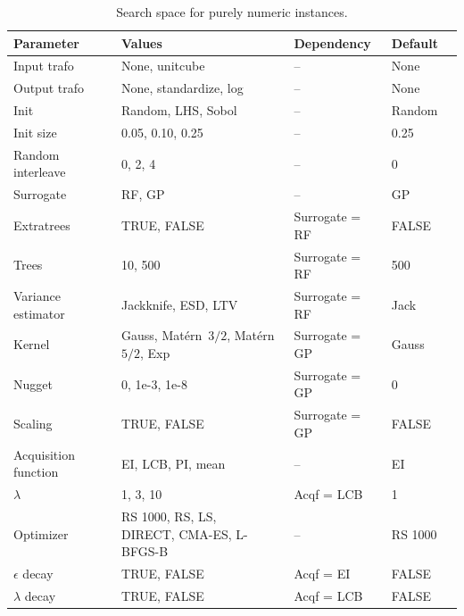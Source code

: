 \begin{table}[H]
  \centering
  \caption{Search space for purely numeric instances.}
  \label{tab:mlr3mbo-search-space-numeric}
  \begin{tabular}{lllll}
    \toprule
    Parameter            & Values                          & Dependency     & Default \\
    \midrule
    Input trafo          & None, unitcube                  & --             & None    \\
    Output trafo         & None, standardize, log          & --             & None    \\
    Init                 & Random, LHS, Sobol              & --             & Random  \\
    Init size            & 0.05, 0.10, 0.25                & --             & 0.25    \\
    Random interleave    & 0, 2, 4                         & --             & 0       \\
    Surrogate            & RF, GP                          & --             & GP      \\
    Extratrees           & TRUE, FALSE                     & Surrogate = RF &  FALSE  \\
    Trees                & 10, 500                         & Surrogate = RF & 500     \\
    Variance estimator   & Jackknife, ESD, LTV             & Surrogate = RF &  Jack    \\
    Kernel               & \makecell[l]{Gauss, Matérn~$3/2$,                            \\ Matérn~$5/2$, Exp}   & Surrogate = GP & Gauss \\
    Nugget               & 0, 1e-3, 1e-8                   & Surrogate = GP & 0       \\
    Scaling              & TRUE, FALSE                     & Surrogate = GP & FALSE   \\
    Acquisition function & EI, LCB, PI, mean               & --             & EI    \\
    $\lambda$            & 1, 3, 10                        & Acqf = LCB     & 1     \\
    Optimizer            & \makecell[l]{RS 1000, RS, LS,                              \\DIRECT, CMA-ES, L-BFGS-B} & -- & RS 1000 \\
    $\epsilon$ decay     & TRUE, FALSE                     & Acqf = EI      &  FALSE      \\
    $\lambda$ decay      & TRUE, FALSE                     & Acqf = LCB     &  FALSE     \\
    \bottomrule
  \end{tabular}
\end{table}
